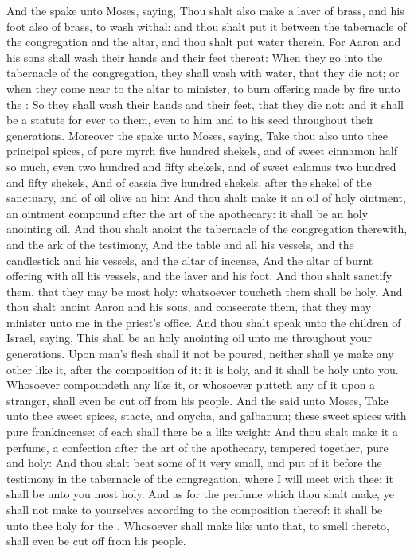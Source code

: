\begin{biblechapter}
 And the \LORD spake unto Moses, saying,
\verse Thou shalt also make a laver of brass, and his foot also of brass, to wash withal: and thou shalt put it between the tabernacle of the congregation and the altar, and thou shalt put water therein.
\verse For Aaron and his sons shall wash their hands and their feet thereat:
\verse When they go into the tabernacle of the congregation, they shall wash with water, that they die not; or when they come near to the altar to minister, to burn offering made by fire unto the \LORD:
\verse So they shall wash their hands and their feet, that they die not: and it shall be a statute for ever to them, even to him and to his seed throughout their generations.
 Moreover the \LORD spake unto Moses, saying,
\verse Take thou also unto thee principal spices, of pure myrrh five hundred shekels, and of sweet cinnamon half so much, even two hundred and fifty shekels, and of sweet calamus two hundred and fifty shekels,
\verse And of cassia five hundred shekels, after the shekel of the sanctuary, and of oil olive an hin:
\verse And thou shalt make it an oil of holy ointment, an ointment compound after the art of the apothecary: it shall be an holy anointing oil.
\verse And thou shalt anoint the tabernacle of the congregation therewith, and the ark of the testimony,
\verse And the table and all his vessels, and the candlestick and his vessels, and the altar of incense,
\verse And the altar of burnt offering with all his vessels, and the laver and his foot.
\verse And thou shalt sanctify them, that they may be most holy: whatsoever toucheth them shall be holy.
\verse And thou shalt anoint Aaron and his sons, and consecrate them, that they may minister unto me in the priest's office.
\verse And thou shalt speak unto the children of Israel, saying, This shall be an holy anointing oil unto me throughout your generations.
\verse Upon man's flesh shall it not be poured, neither shall ye make any other like it, after the composition of it: it is holy, and it shall be holy unto you.
\verse Whosoever compoundeth any like it, or whosoever putteth any of it upon a stranger, shall even be cut off from his people.
 And the \LORD said unto Moses, Take unto thee sweet spices, stacte, and onycha, and galbanum; these sweet spices with pure frankincense: of each shall there be a like weight:
\verse And thou shalt make it a perfume, a confection after the art of the apothecary, tempered together, pure and holy:
\verse And thou shalt beat some of it very small, and put of it before the testimony in the tabernacle of the congregation, where I will meet with thee: it shall be unto you most holy.
\verse And as for the perfume which thou shalt make, ye shall not make to yourselves according to the composition thereof: it shall be unto thee holy for the \LORD.
\verse Whosoever shall make like unto that, to smell thereto, shall even be cut off from his people.
\end{biblechapter}

